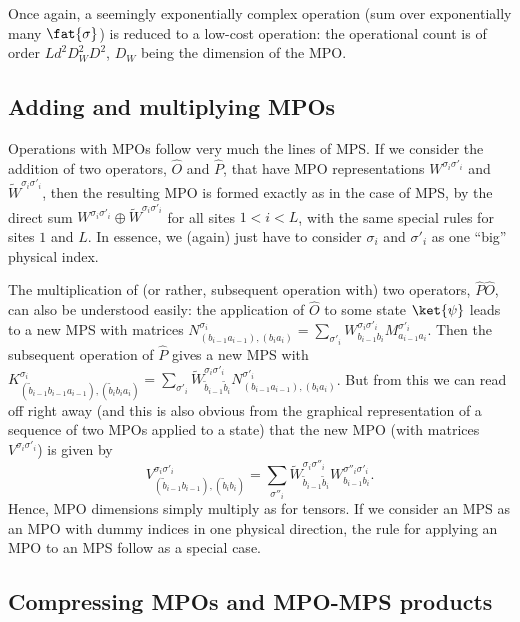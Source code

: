 Once again, a seemingly exponentially complex operation (sum over exponentially many $\fat{\sigma}$) is reduced to a low-cost operation: the operational count is of order 
$Ld^2 D_W^2 D^2$, $D_W$ being the dimension of the MPO.

\subsection{Adding and multiplying MPOs}

Operations with MPOs follow very much the lines of MPS. If we consider the addition of two operators, $\hat{O}$ and $\hat{P}$, that have MPO representations $W^{\sigma_i\sigma'_i}$ and 
$\tilde{W}^{\sigma_i\sigma'_i}$, then the resulting MPO is formed exactly as in the case of MPS, by the direct sum $W^{\sigma_i\sigma'_i} \oplus \tilde{W}^{\sigma_i\sigma'_i}$ for all sites $1 < i < L$, with the same special rules for sites $1$ and $L$. In essence, we (again) just have to consider $\sigma_i$ and $\sigma'_i$ as one ``big'' physical index. 

The multiplication of (or rather, subsequent operation with) two operators, $\hat{P} \hat{O}$, can also be understood easily: the application of $\hat{O}$ to some state $\ket{\psi}$ leads to a new MPS with 
matrices $N^{\sigma_i}_{(b_{i-1}a_{i-1}),(b_i a_i)} = \sum_{\sigma'_i} W^{\sigma_i\sigma'_i}_{b_{i-1}b_i} M^{\sigma'_i}_{a_{i-1}a_i}$. Then the subsequent operation of $\hat{P}$ gives a new MPS with $K^{\sigma_i}_{(\tilde{b}_{i-1}b_{i-1}a_{i-1}),(\tilde{b}_i b_i a_i)} =  \sum_{\sigma'_i} \tilde{W}^{\sigma_i\sigma'_i}_{\tilde{b}_{i-1} \tilde{b}_i} N^{\sigma'_i}_{(b_{i-1}a_{i-1}),(b_i a_i)}$. But from this we can read off right away (and this is also obvious from the graphical representation of a sequence of two MPOs applied to a state) that the new MPO (with matrices $V^{\sigma_i\sigma'_i}$) is given by
\begin{equation}
V^{\sigma_i\sigma'_i}_{(\tilde{b}_{i-1}b_{i-1}),(\tilde{b}_{i}b_{i})} = \sum_{\sigma''_i} 
\tilde{W}^{\sigma_i\sigma''_i}_{\tilde{b}_{i-1} \tilde{b}_i} W^{\sigma''_i\sigma'_i}_{b_{i-1}b_i} .
\end{equation}
Hence, MPO dimensions simply multiply as for tensors. If we consider an MPS as an MPO with dummy indices in one physical direction, the rule for applying an MPO to an MPS follow as a special case. 
 
\subsection{Compressing MPOs and MPO-MPS products}

